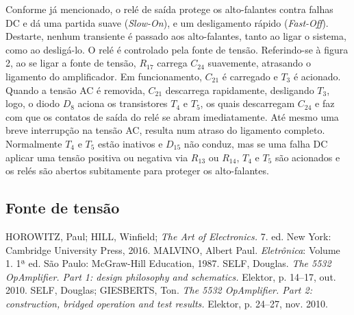 \documentclass[12pt, a4paper, leqno, twoside]{book}
\begin{document}
  Conforme j\'a mencionado, o rel\'e de sa\'ida protege os alto-falantes contra falhas DC e d\'a uma partida suave ({\it Slow-On}\/), e um desligamento r\'apido ({\it Fast-Off}\/). Destarte, nenhum transiente \'e passado aos alto-falantes, tanto ao ligar o sistema, como ao deslig\'a-lo. O rel\'e \'e controlado pela fonte de tens\~ao. Referindo-se \`a figura 2, ao se ligar a fonte de tens\~ao, $R_{17}$ carrega $C_{24}$ suavemente, atrasando o ligamento do amplificador. Em funcionamento, $C_{21}$ \'e carregado e $T_3$ \'e acionado. Quando a tens\~ao AC \'e removida, $C_{21}$ descarrega rapidamente, desligando $T_3$, logo, o diodo $D_8$ aciona os transistores $T_4$ e $T_5$, os quais descarregam $C_{24}$ e faz com que os contatos de sa\'ida do rel\'e se abram imediatamente. At\'e mesmo uma breve interrup\c c\~ao na tens\~ao AC, resulta num atraso do ligamento completo. Normalmente $T_4$ e $T_5$ est\~ao inativos e $D_{15}$ n\~ao conduz, mas se uma falha DC aplicar uma tens\~ao positiva ou negativa via $R_{13}$ ou $R_{14}$, $T_4$ e $T_5$ s\~ao acionados e os rel\'es s\~ao abertos subitamente para proteger os alto-falantes.

  \subsection{Fonte de tens\~ao}
  \begin{thebibliography}{}
    HOROWITZ, Paul; HILL, Winfield; {\it The Art of Electronics.} 7. ed. New York: Cambridge University Press, 2016.
    MALVINO, Albert Paul. {\it Eletr\^onica\/}: Volume 1. 1ª ed. S\~ao Paulo: McGraw-Hill Education, 1987.
    SELF, Douglas. {\it The 5532 OpAmplifier. Part 1: design philosophy and schematics.} Elektor, p. 14--17, out. 2010.
    SELF, Douglas; GIESBERTS, Ton. {\it The 5532 OpAmplifier. Part 2: construction, bridged operation and test results.} Elektor, p. 24--27, nov. 2010.
  \end{thebibliography}
\end{document}

